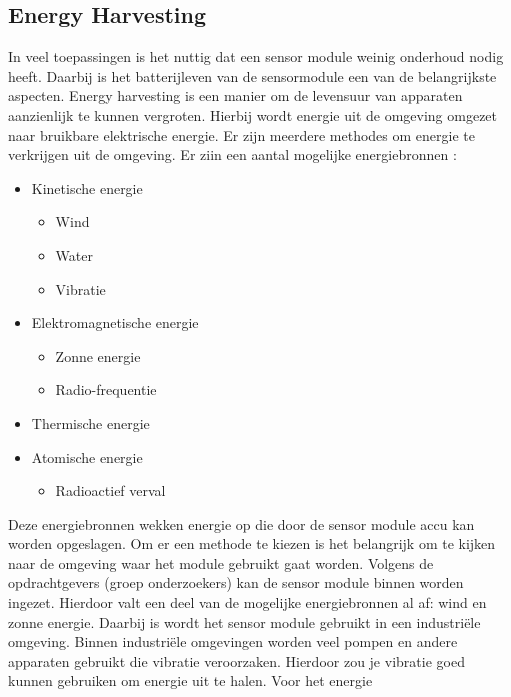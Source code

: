 \subsection{Energy Harvesting}
In veel toepassingen is het nuttig dat een sensor module weinig onderhoud nodig heeft. Daarbij is het batterijleven van de sensormodule een van de belangrijkste aspecten. Energy harvesting is een manier om de levensuur van apparaten aanzienlijk te kunnen vergroten. Hierbij wordt energie uit de omgeving omgezet naar bruikbare elektrische energie. Er zijn meerdere methodes om energie te verkrijgen uit de omgeving. Er ziin een aantal mogelijke energiebronnen \cite{energyHarvesting}:
\begin{itemize}
    \item Kinetische energie
    \begin{itemize}
        \item Wind
        \item Water
        \item Vibratie
    \end{itemize}
    \item Elektromagnetische energie
    \begin{itemize}
        \item Zonne energie
        \item Radio-frequentie
    \end{itemize}
    \item Thermische energie
    \item Atomische energie
    \begin{itemize}
        \item Radioactief verval
    \end{itemize}
\end{itemize} 

Deze energiebronnen wekken energie op die door de sensor module accu kan worden opgeslagen. Om er een methode te kiezen is het belangrijk om te kijken naar de omgeving waar het module gebruikt gaat worden. Volgens de opdrachtgevers (groep onderzoekers) kan de sensor module binnen worden ingezet. Hierdoor valt een deel van de mogelijke energiebronnen al af: wind en zonne energie. Daarbij is wordt het sensor module gebruikt in een industriële omgeving. Binnen industriële omgevingen worden veel pompen en andere apparaten gebruikt die vibratie veroorzaken. Hierdoor zou je vibratie goed kunnen gebruiken om energie uit te halen. Voor het energie 


